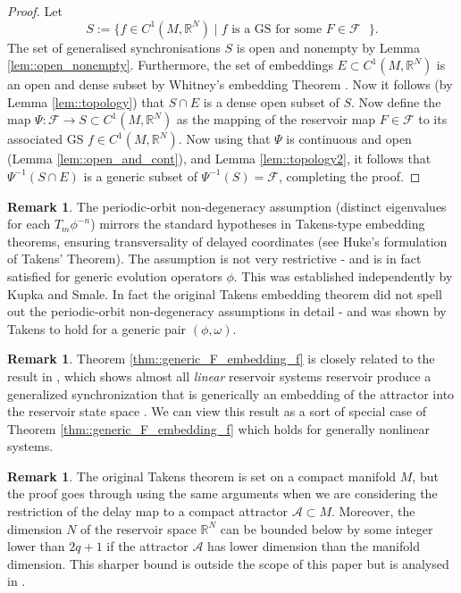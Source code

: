 \documentclass{article}
\theoremstyle{definition}
\theoremstyle{definition}
\newtheorem{remark}[theorem]{Remark}
\numberwithin{theorem}{section}
\begin{document}
\begin{proof}
Let 
\[
    S := \{ f \in C^1(M,\mathbb{R}^N) \mid f \text{ is a GS for some $F \in \mathcal{F}$ } \}.
\]
 The set of generalised synchronisations \(S\) is open and nonempty by Lemma \ref{lem::open_nonempty}. Furthermore, the set of embeddings \(E \subset C^1(M,\mathbb{R}^N)\) is an open and dense subset by Whitney's embedding Theorem \cite{Whitney1936,Lee2013}. Now it follows (by Lemma \ref{lem::topology}) that \(S \cap E\) is a dense open subset of \(S\). Now define the map $\Psi : \mathcal{F} \to S \subset C^1(M,\mathbb{R}^N)$ as the mapping of the reservoir map $F \in \mathcal{F}$ to its associated GS $f \in C^1(M,\mathbb{R}^N)$.
Now using that $\Psi$ is continuous and open (Lemma \ref{lem::open_and_cont}), and Lemma \ref{lem::topology2}, it follows that
$\Psi^{-1}(S \cap E)$
is a generic subset of \(\Psi^{-1}(S) = \mathcal{F} \), completing the proof.
\end{proof}

\begin{remark}
The periodic-orbit non-degeneracy assumption (distinct eigenvalues for each $T_m\phi^{-n}$) mirrors the standard hypotheses in Takens-type embedding theorems, ensuring transversality of delayed coordinates (see Huke’s formulation of Takens’ Theorem). The assumption is not very restrictive - and is in fact satisfied for generic evolution operators $\phi$. This was established independently by Kupka \cite{Kupka1963}\cite{Kupka1963} and \cite{Smale1963} Smale. In fact the original Takens embedding theorem \cite{Takens1981Detecting} did not spell out the periodic-orbit non-degeneracy assumptions in detail - and was shown by Takens to hold for a generic pair $(\phi,\omega)$.
\end{remark}

\begin{remark}
    Theorem \ref{thm::generic_F_embedding_f} is closely related to the result in \cite{Grigoryeva2023}, which shows almost all \emph{linear} reservoir systems reservoir produce a generalized synchronization that is generically an embedding of the attractor into the reservoir state space \cite{Grigoryeva2023}. We can view this result as a sort of special case of Theorem \ref{thm::generic_F_embedding_f} which holds for generally nonlinear systems.
\end{remark}

\begin{remark}
    The original Takens theorem \cite{Takens1981Detecting} is set on a compact manifold $M$, but the proof goes through using the same arguments when we are considering the restriction of the delay map to a compact attractor $\mathcal{A} \subset M$. Moreover, the dimension $N$ of the reservoir space $\mathbb{R}^N$ can be bounded below by some integer lower than $2q + 1$ if the attractor $\mathcal{A}$ has lower dimension than the manifold dimension. This sharper bound is outside the scope of this paper but is analysed in \cite{sauer1991embedology}.
\end{remark}
\end{document}
